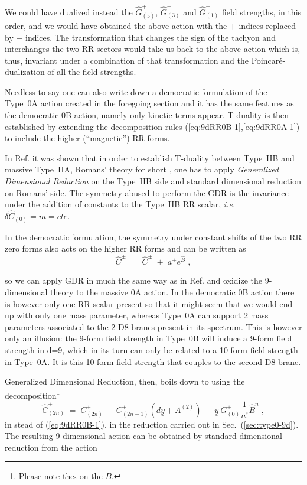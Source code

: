 \documentclass[12pt,a4paper]{article}
\begin{document}
We could have dualized instead the $\hat{G}^{+}_{(5)}$,
$\hat{G}^{+}_{(3)}$ and $\hat{G}^{+}_{(1)}$ field strengths, in this
order, and we would have obtained the above action with the $+$ indices
replaced by $-$ indices. The transformation that changes the
sign of the tachyon and interchanges the two RR sectors would take us
back to the above action which is, thus, invariant under a combination
of that transformation and the Poincar\'e-dualization of all the field
strengths.

Needless to say one can also write down a democratic
formulation of the Type~0A
action created in the foregoing section and it has the same features
as the democratic 0B action, namely only kinetic terms appear.
T-duality is then established by extending the decomposition
rules (\ref{eq:9dRR0B-1},\ref{eq:9dRR0A-1}) to include the higher
(``magnetic'') RR forms.

In Ref. \cite{kn:BRGPT} it was shown that in order to establish
T-duality between Type~IIB and massive Type~IIA, Romans' theory
for short \cite{kn:Ro2}, one has to apply 
{\em Generalized Dimensional Reduction}
on the Type~IIB side and standard dimensional reduction on Romans' side.
The symmetry abused to perform the GDR is the invariance under
the addition of constants to the Type~IIB RR scalar,
{\em i.e.} $\delta \hat{C}_{(0)}= m= cte.$ 

In the democratic formulation, the symmetry under constant shifts
of the two RR zero forms also acts on the higher RR forms
and can be written as
\begin{equation}
  \label{eq:shiftsymmetry-2}
  \hat{C}^{\pm}\;=\; \hat{C}^{\pm}\;+\; a^{\pm}e^{\hat{B}} \; ,
\end{equation}

so we can apply GDR in much the same way as in Ref. \cite{kn:BRGPT}
and oxidize the 9-dimensional theory to the massive 0A action.
In the democratic 0B action there
is however only one RR scalar present so that it might seem that 
we would end up with only one mass parameter, whereas Type~0A can
support 2 mass parameters associated to the 2 D8-branes present in
its spectrum. This is however only an illusion: the 9-form field strength
in Type~0B will induce a 9-form field strength in d=9, which in its 
turn can only be related to a 10-form field strength in Type~0A. It
is this 10-form field strength that couples to the second D8-brane.

Generalized Dimensional Reduction, then, boils down to using the
decomposition\footnote{Please note the $\hat{}$ on the $B$.}
\begin{equation}
  \label{eq:9dRR0B-mas}
  \hat{C}_{(2n)}^{+}\;=\; C_{(2n)}^{+}\,-\, C^{+}_{(2n-1)}\left(
                                                    d\underline{y}+A^{(2)}
                                                  \right) 
                          \,+\, \underline{y}\  G_{(0)}^{+}
                          \textstyle{\frac{1}{n!}}\hat{B}^{n}\; ,
\end{equation}
in stead of (\ref{eq:9dRR0B-1}), in the 
reduction carried out in Sec.~(\ref{sec:type0-9d}).
The resulting 9-dimensional action can be obtained by standard
dimensional reduction from the action
\end{document}
